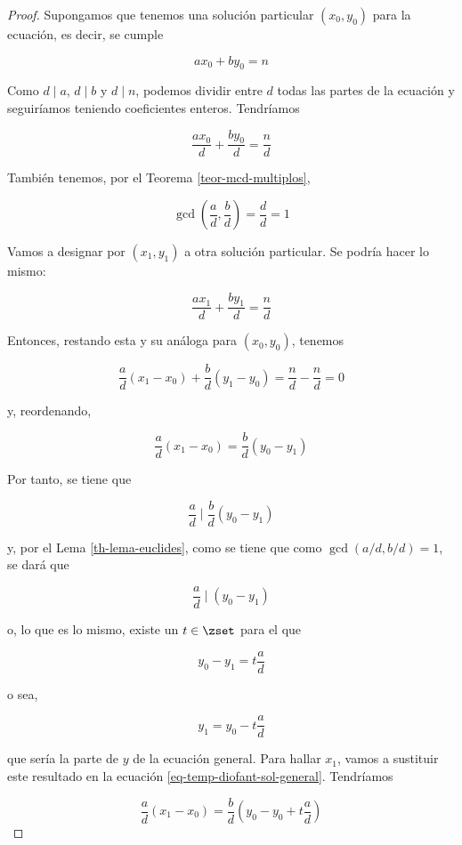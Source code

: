\begin{proof}
  Supongamos que tenemos una solución particular $(x_0, y_0)$ para la
  ecuación, es decir, se cumple

  $$ ax_0 + by_0 = n $$

  Como $d \mid a$, $d \mid b$ y $d \mid n$, podemos dividir entre $d$ todas
  las partes de la ecuación y seguiríamos teniendo coeficientes enteros.
  Tendríamos

  $$ \frac{ax_0}{d} + \frac{by_0}{d} = \frac{n}{d} $$

  También tenemos, por el Teorema \ref{teor-mcd-multiplos},

  $$ \gcd\left(\frac{a}{d}, \frac{b}{d}\right) = \frac{d}{d} = 1 $$

  Vamos a designar por $(x_1, y_1)$ a otra solución particular. Se podría
  hacer lo mismo:

  $$ \frac{ax_1}{d} + \frac{by_1}{d} = \frac{n}{d} $$

  Entonces, restando esta y su análoga para $(x_0, y_0)$, tenemos

  $$ \frac{a}{d}(x_1 - x_0) + \frac{b}{d}(y_1 - y_0) = \frac{n}{d} -
  \frac{n}{d} = 0 $$

  \noindent y, reordenando,

  \begin{equation}\label{eq-temp-diofant-sol-general}
  \frac{a}{d}(x_1 - x_0) = \frac{b}{d}(y_0 - y_1)
  \end{equation}

  Por tanto, se tiene que

  $$ \frac{a}{d} \mid \frac{b}{d} (y_0 - y_1) $$

  \noindent y, por el Lema \ref{th-lema-euclides}, como se tiene que como
  $\gcd(a/d, b/d) = 1$, se dará que

  $$ \frac{a}{d} \mid (y_0 - y_1) $$

  \noindent o, lo que es lo mismo, existe un $t \in \zset$ para el que

  $$ y_0 - y_1 = t \frac{a}{d} $$

  \noindent o sea,

  $$ y_1 = y_0 - t \frac{a}{d} $$

  \noindent que sería la parte de $y$ de la ecuación general. Para hallar
  $x_1$, vamos a sustituir este resultado en la ecuación
  \ref{eq-temp-diofant-sol-general}. Tendríamos

  $$ \frac{a}{d}(x_1 - x_0) = \frac{b}{d}\left(y_0 - y_0 +
    t\frac{a}{d}\right) $$


\end{proof}
